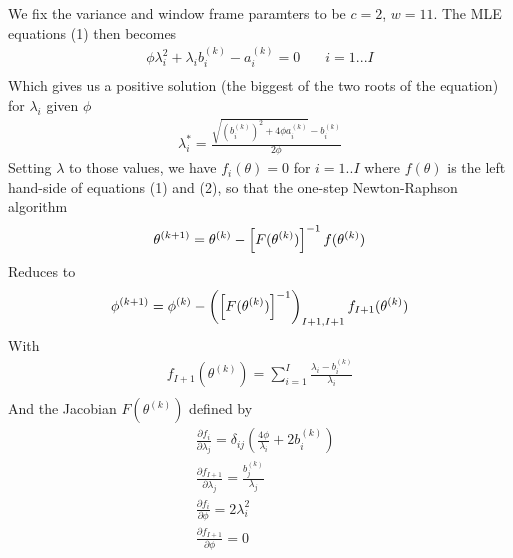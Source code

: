 \documentclass[twoside]{article}
\begin{document}
We fix the variance and window frame paramters to be $c = 2$, $w=11$. The MLE equations (1) then becomes
\begin{align*}
\phi \lambda_i^{2} + \lambda_i b_i^{(k)} - a_i^{(k)} = 0 &  \quad i = 1...I \\
\end{align*}
Which gives us a positive solution (the biggest of the two roots of the equation) for $\lambda_i$ given $\phi$
\begin{align*}
\lambda^*_i = \frac{\sqrt{(b_i^{(k)})^2 + 4 \phi a_i^{(k)}} - b_i^{(k)}}{2 \phi}
\end{align*}
Setting $\lambda$ to those values, we have $f_i(\theta) = 0$ for $i = 1..I$ where $f(\theta)$ is the left hand-side of equations (1) and (2), so that the one-step Newton-Raphson algorithm
\begin{align*}
\theta^{(k + 1)} = \theta^{(k)} - \left[ F ( \theta^{(k)} ) \right]^{-1} \* f(\theta^{(k)})
\end{align*}
Reduces to
\begin{align*}
\phi^{(k + 1)} = \phi^{(k)} - \left(\left[ F ( \theta^{(k)} ) \right]^{-1}\right)_{I + 1, I + 1} \* f_{I + 1}(\theta^{(k)})
\end{align*}
With
\begin{align*}
f_{I + 1}(\theta^{(k)}) = \sum_{i = 1}^I \frac{\lambda_i - b_i^{(k)}}{\lambda_i}\\
\end{align*}
And the Jacobian $F ( \theta^{(k)})$ defined by
\begin{align*}
& \frac{\partial f_i}{\partial \lambda_j} = \delta_{i j} \left( \frac{4 \phi}{\lambda_i} + 2 b_i^{(k)} \right)\\
& \frac{\partial f_{I + 1}}{\partial \lambda_j} = \frac{b_j^{(k)}}{\lambda_j}\\
& \frac{\partial f_i}{\partial \phi} = 2 \lambda_i^2\\
& \frac{\partial f_{I + 1}}{\partial \phi} = 0\\
\end{align*}

\end{document}
